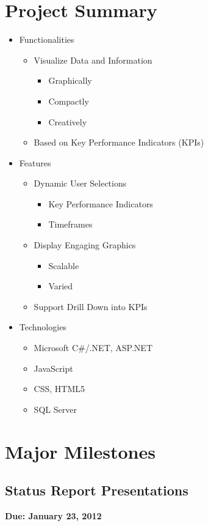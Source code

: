 \documentclass[11pt,a4paper,oneside]{article}
\begin{document}
\section{Project Summary}
\begin{itemize}
\item Functionalities
  \begin{itemize}
  \item Visualize Data and Information
    \begin{itemize}
    \item Graphically
    \item Compactly
    \item Creatively
    \end{itemize}
  \item Based on Key Performance Indicators (KPIs)
  \end{itemize}
\item Features
  \begin{itemize}
  \item Dynamic User Selections
    \begin{itemize}
    \item Key Performance Indicators
    \item Timeframes
    \end{itemize}
  \item Display Engaging Graphics
    \begin{itemize}
    \item Scalable
    \item Varied
    \end{itemize}
  \item Support Drill Down into KPIs
  \end{itemize}
\item Technologies
  \begin{itemize}
  \item Microsoft C\#/.NET, ASP.NET
  \item JavaScript
  \item CSS, HTML5
  \item SQL Server
  \end{itemize}
\end{itemize}



\section{Major Milestones}

\subsection{Status Report Presentations}
\textbf{Due: January 23, 2012}\\
\end{document}
